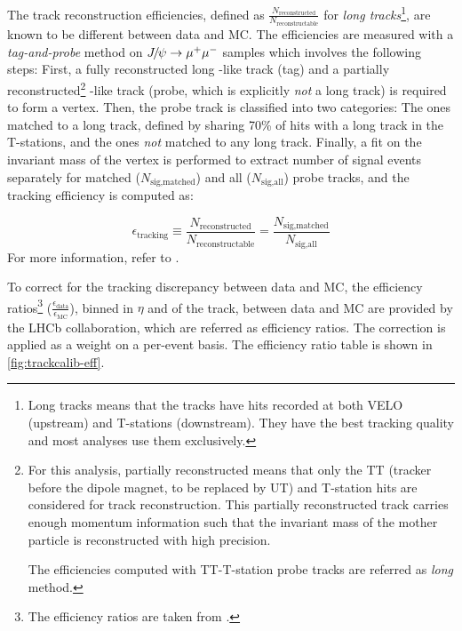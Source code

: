 The track reconstruction efficiencies,
defined as $\frac{N_\text{reconstructed}}{N_\text{reconstructable}}$ for
\emph{long tracks}\footnote{
    Long tracks means that the tracks have hits recorded at both VELO (upstream)
    and T-stations (downstream).
    They have the best tracking quality and most analyses use them exclusively.
},
are known to be different between data and MC.
The efficiencies are measured with a \emph{tag-and-probe} method on
${{J\mskip -3mu/\mskip -2mu\psi}} \rightarrow {\ensuremath{\mu^+}}{\ensuremath{\mu^-}}$ samples
which involves the following steps:
First, a fully reconstructed long \muon-like track (tag) and a partially
reconstructed\footnote{
    For this analysis, partially reconstructed means that only the
    TT (tracker before the dipole magnet, to be replaced by UT)
    and T-station hits are considered for track reconstruction.
    This partially reconstructed track carries enough momentum information
    such that the invariant mass of the mother particle is reconstructed
    with high precision.

    The efficiencies computed with TT-T-station probe tracks are referred
    as \emph{long} method.
} \muon-like track (probe, which is explicitly \emph{not} a long track) is
required to form a \mun\mup vertex.
Then, the probe track is classified into two categories: The ones matched to a
long track, defined by sharing 70\% of hits with a long track in the T-stations,
and the ones \emph{not} matched to any long track.
Finally, a fit on the invariant mass of the \mun\mup vertex is performed to
extract number of signal events
separately for matched ($N_\text{sig,matched}$)
and all ($N_\text{sig,all}$) probe tracks,
and the tracking efficiency is computed as:

\begin{equation}
    \epsilon_\text{tracking} \equiv
        \frac{N_\text{reconstructed}}{N_\text{reconstructable}}
        = \frac{N_\text{sig,matched}}{N_\text{sig,all}}
\end{equation}
For more information, refer to \cite{LHCb-PUB-2011-025,LHCb-DP-2013-002}.

To correct for the tracking discrepancy between data and MC,
the efficiency ratios\footnote{
    The efficiency ratios are taken from
    .
}
($\frac{\epsilon_\text{data}}{\epsilon_\text{MC}}$),
binned in $\eta$ and \ptot of the track,
between data and MC are provided by the LHCb collaboration, which are
referred as \trackcalib efficiency ratios.
The correction is applied as a weight on a per-event basis.
The efficiency ratio table is shown in \cref{fig:trackcalib-eff}.


